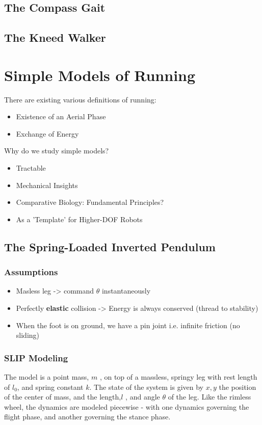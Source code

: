 \subsection{The Compass Gait}
\subsection{The Kneed Walker}


\section{Simple Models of Running}
There are existing various definitions of running:
\begin{itemize}
\item Existence of an Aerial Phase
\item Exchange of Energy 
\end{itemize}
Why do we study simple models?
\begin{itemize}
\item Tractable
\item Mechanical Insights
\item Comparative Biology: Fundamental Principles?
\item As a 'Template' for Higher-DOF Robots
\end{itemize}
\subsection{The Spring-Loaded Inverted Pendulum}
\subsubsection{Assumptions}
\begin{itemize}
\item Masless leg -> command $\theta$ instantaneously
\item Perfectly \textbf{elastic} collision -> Energy is always conserved (thread to stability)
\item When the foot is on ground, we have a pin joint i.e. infinite friction (no sliding)
\end{itemize}
\subsubsection{SLIP Modeling}
The model is a point mass, $m$ , on top of a massless, springy leg with rest length of
$l_0$, and spring constant $k$. The state of the system is given by $x,y$ the position of the center of mass, and the length,$l$ , and angle $\theta$ of the leg. Like the rimless wheel, the dynamics are modeled piecewise - with one dynamics governing the flight phase, and another governing the stance phase.

